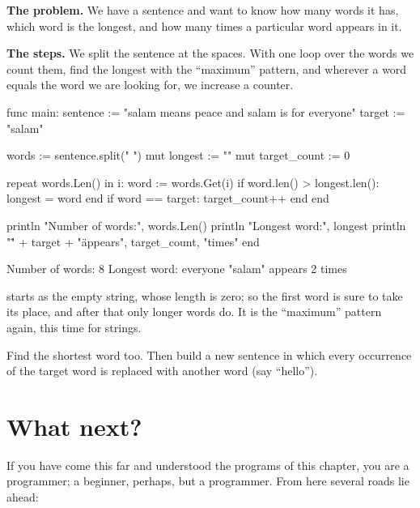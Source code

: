 \textbf{The problem.} We have a sentence and want to know how many words it
has, which word is the longest, and how many times a particular word appears
in it.

\textbf{The steps.} We split the sentence at the spaces. With one loop over
the words we count them, find the longest with the ``maximum'' pattern, and
wherever a word equals the word we are looking for, we increase a counter.

\begin{salamcode}
func main:
    sentence := "salam means peace and salam is for everyone"
    target := "salam"

    words := sentence.split(" ")
    mut longest := ""
    mut target_count := 0

    repeat words.Len() in i:
        word := words.Get(i)
        if word.len() > longest.len():
            longest = word
        end
        if word == target:
            target_count++
        end
    end

    println "Number of words:", words.Len()
    println "Longest word:", longest
    println "\"" + target + "\" appears", target_count, "times"
end
\end{salamcode}

\begin{salamout}
Number of words: 8
Longest word: everyone
"salam" appears 2 times
\end{salamout}

 starts as the empty string, whose length is zero; so the
first word is sure to take its place, and after that only longer words do.
It is the ``maximum'' pattern again, this time for strings.

\begin{tip}
Find the shortest word too. Then build a new sentence in which every
occurrence of the target word is replaced with another word (say
``hello'').
\end{tip}

\section{What next?}

If you have come this far and understood the programs of this chapter, you
are a programmer; a beginner, perhaps, but a programmer. From here several
roads lie ahead:

